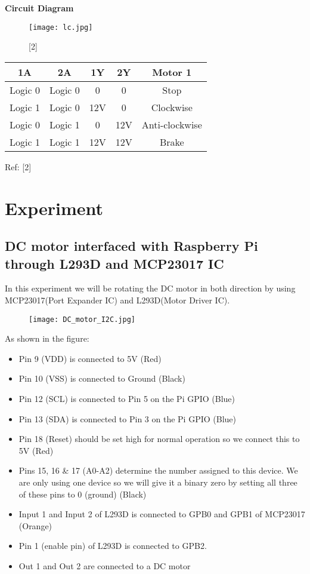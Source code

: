 \documentclass[11pt,a4paper]{article}
\begin{document}
    \vspace{0.3cm}
    \textbf{Circuit Diagram}
    
    \begin{figure}[h!]
    	\texttt{[image: lc.jpg]}
    	\centering
    	\caption{[2]}
    \end{figure}
    
    \vspace{0.5cm}
    \centering
    \begin{tabular}{|c|c|c|c|c|}
    	\hline
    	1A & 2A	& 1Y & 2Y & Motor 1\\
    	\hline
    	Logic 0	& Logic 0 & 0 & 0 & Stop \\
    	\hline
    	Logic 1	& Logic 0 & 12V	& 0	& Clockwise\\
    	\hline
    	Logic 0	& Logic 1 & 0 & 12V	& Anti-clockwise\\
    	\hline
    	Logic 1	& Logic 1 & 12V & 12V & Brake\\
    	\hline
    \end{tabular}
    \newline
    Ref: [2]
    
    \newpage
    \flushleft 
	\section{Experiment}
		\subsection{ DC motor interfaced with Raspberry Pi through L293D and MCP23017 IC}
	In this experiment we will be rotating the DC motor in both direction by using MCP23017(Port Expander IC) and L293D(Motor Driver IC).
	  
	\begin{figure}[h!]
		\texttt{[image: DC\_motor\_I2C.jpg]}
		\centering
	\end{figure} 
	As shown in the figure:
	\begin{itemize}
		\item Pin 9 (VDD) is connected to 5V (Red)
		\item Pin 10 (VSS) is connected to Ground (Black)
		\item Pin 12 (SCL) is connected to Pin 5 on the Pi GPIO (Blue)
		\item Pin 13 (SDA) is connected to Pin 3 on the Pi GPIO (Blue)
		\item Pin 18 (Reset) should be set high for normal operation so we connect this to 5V (Red)
		\item Pins 15, 16 \& 17 (A0-A2) determine the number assigned to this device. We are only using one device so we will give it a binary zero by setting all three of these pins to 0 (ground) (Black)
		\item Input 1 and Input 2 of L293D is connected to GPB0 and GPB1 of MCP23017 (Orange)
		\item Pin 1 (enable pin) of L293D is connected to GPB2.
		\item Out 1 and Out 2 are connected to a DC motor
	\end{itemize}
	
\end{document}
